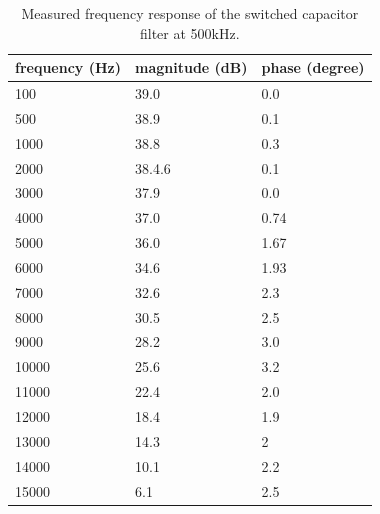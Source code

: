 \begin{table}[!ht]
    \centering
    \begin{tabular}{|l|l|l|}
    \hline
        frequency (Hz) & magnitude (dB) & phase (degree) \\ \hline \hline
        100 & 39.0 & 0.0 \\ \hline
        500 & 38.9 & 0.1 \\ \hline
        1000 & 38.8 & 0.3 \\ \hline
        2000 & 38.4.6 & 0.1 \\ \hline
        3000 & 37.9 & 0.0 \\ \hline
        4000 & 37.0 & 0.74 \\ \hline
        5000 & 36.0 & 1.67 \\ \hline
        6000 & 34.6 & 1.93 \\ \hline
        7000 & 32.6 & 2.3 \\ \hline
        8000 & 30.5 & 2.5 \\ \hline
        9000 & 28.2 & 3.0 \\ \hline
        10000 & 25.6 & 3.2 \\ \hline
        11000 & 22.4 & 2.0 \\ \hline
        12000 & 18.4 & 1.9 \\ \hline
        13000 & 14.3 & 2 \\ \hline
        14000 & 10.1 & 2.2 \\ \hline
        15000 & 6.1 & 2.5 \\ \hline
    \end{tabular}
    \captionsetup{justification=centering,singlelinecheck=true}
        \caption{Measured frequency response of the switched capacitor filter at 500kHz.}
\label{tab:Messermunt_3}
\end{table}